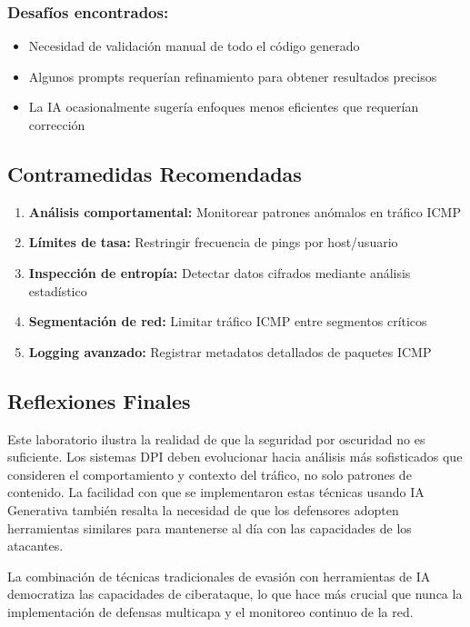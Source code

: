 \documentclass[letter,12pt]{article}
\begin{document}
\subsubsection*{Desafíos encontrados:}
\begin{itemize}
    \item Necesidad de validación manual de todo el código generado
    \item Algunos prompts requerían refinamiento para obtener resultados precisos
    \item La IA ocasionalmente sugería enfoques menos eficientes que requerían corrección
\end{itemize}



\subsection*{Contramedidas Recomendadas}

\begin{enumerate}
    \item \textbf{Análisis comportamental:} Monitorear patrones anómalos en tráfico ICMP
    \item \textbf{Límites de tasa:} Restringir frecuencia de pings por host/usuario
    \item \textbf{Inspección de entropía:} Detectar datos cifrados mediante análisis estadístico
    \item \textbf{Segmentación de red:} Limitar tráfico ICMP entre segmentos críticos
    \item \textbf{Logging avanzado:} Registrar metadatos detallados de paquetes ICMP
\end{enumerate}

\subsection*{Reflexiones Finales}

Este laboratorio ilustra la realidad de que la seguridad por oscuridad no es suficiente. Los sistemas DPI deben evolucionar hacia análisis más sofisticados que consideren el comportamiento y contexto del tráfico, no solo patrones de contenido. La facilidad con que se implementaron estas técnicas usando IA Generativa también resalta la necesidad de que los defensores adopten herramientas similares para mantenerse al día con las capacidades de los atacantes.

La combinación de técnicas tradicionales de evasión con herramientas de IA democratiza las capacidades de ciberataque, lo que hace más crucial que nunca la implementación de defensas multicapa y el monitoreo continuo de la red.
\end{document}
